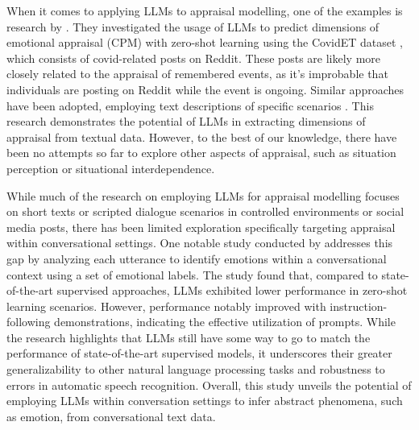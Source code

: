 When it comes to applying LLMs to appraisal modelling, one of the examples is research by \citeauthor{zhan-etal-2022-feel} \cite{zhan-etal-2023-evaluating}. They investigated the usage of LLMs to predict dimensions of emotional appraisal (CPM) with zero-shot learning using the CovidET dataset \cite{zhan-etal-2022-feel}, which consists of covid-related posts on Reddit. These posts are likely more closely related to the appraisal of remembered events, as it's improbable that individuals are posting on Reddit while the event is ongoing.  Similar approaches have been adopted, employing text descriptions of specific scenarios \cite{broekens2023fine, tak2023gpt, yongsatianchot2023investigating}. This research demonstrates the potential of LLMs in extracting dimensions of appraisal from textual data. However, to the best of our knowledge, there have been no attempts so far to explore other aspects of appraisal, such as situation perception or situational interdependence.



While much of the research on employing LLMs for appraisal modelling focuses on short texts or scripted dialogue scenarios in controlled environments or social media posts, there has been limited exploration specifically targeting appraisal within conversational settings. One notable study conducted by \citeauthor{feng2023affect} \cite{feng2023affect} addresses this gap by analyzing each utterance to identify emotions within a conversational context using a set of emotional labels. The study found that, compared to state-of-the-art supervised approaches, LLMs exhibited lower performance in zero-shot learning scenarios. However, performance notably improved with instruction-following demonstrations, indicating the effective utilization of prompts. While the research highlights that LLMs still have some way to go to match the performance of state-of-the-art supervised models, it underscores their greater generalizability to other natural language processing tasks and robustness to errors in automatic speech recognition. Overall, this study unveils the potential of employing LLMs within conversation settings to infer abstract phenomena, such as emotion, from conversational text data.

